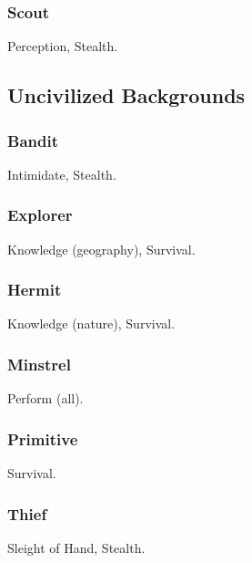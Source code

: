 \subsubsection{Scout}
 Perception, Stealth.

\subsection{Uncivilized Backgrounds}

\subsubsection{Bandit}
 Intimidate, Stealth.

\subsubsection{Explorer}
 Knowledge (geography), Survival.

\subsubsection{Hermit}
 Knowledge (nature), Survival.

\subsubsection{Minstrel}
 Perform (all).

\subsubsection{Primitive}
 Survival.

\subsubsection{Thief}
 Sleight of Hand, Stealth.
